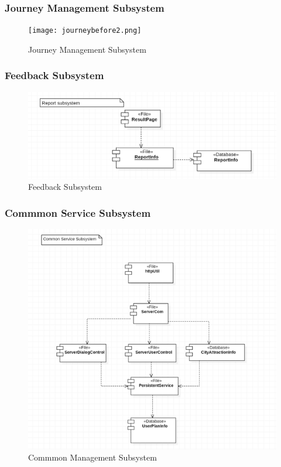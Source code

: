 \documentclass[10pt]{article}
\begin{document}
\subsubsection{Journey Management Subsystem}
\begin{figure}[H]
    \centering
    
    \texttt{[image: journeybefore2.png]}
    \caption{Journey Management Subsystem}
    \label{Journey Management Subsystem}
\end{figure}

\subsubsection{Feedback Subsystem}
\begin{figure}[H]
    \centering
    
    \includegraphics[width=14cm]{reportbefore.png}
    \caption{Feedback Subsystem}
    \label{Feedback Subsystem}
\end{figure}

\subsubsection{Commmon Service Subsystem}
\begin{figure}[H]
    \centering
    
    \includegraphics[width=14cm]{commonbefore.png}
    \caption{Commmon Management Subsystem}
    \label{Commmon Management Subsystem}
\end{figure}
\end{document}
